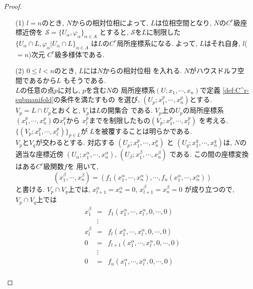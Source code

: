 \documentclass[a4j,12pt]{jarticle}
\theoremstyle{definition}
\begin{document}
\begin{proof}
    \begin{itemize}
        \item[(1)]
        $l=n$のとき, $N$からの相対位相によって, 
        $L$は位相空間となり, 
        $N$の$C^r$級座標近傍を
        $\mathcal{S}=
        \{U_\alpha,\varphi _\alpha\}_{\alpha\in A}$
        とすると, $\mathcal{S}$を$L$に制限した
        $\{U_\alpha \cap L,
        \varphi _\alpha |U_\alpha \cap L\}_{\alpha\in A}$
        は$L$の$C^r$局所座標系になる. 
        よって, $L$はそれ自身, $l$($=n$)次元
        $C^r$級多様体である. 
        \item[(2)] 
        $0\leq l<n$のとき, $L$には$N$からの相対位相
        を入れる. $N$がハウスドルフ空間であるから$L$
        もそうである. \\
        $L$の任意の点$p$に対し, $p$を含む$N$の
        局所座標系$(U;x_1,\cdots ,x_n)$で定義
        \ref{def:C^r-submanifold}の条件を満たすもの
        を選び, $(U_p;x^p_1,\cdots ,x^p_n)$とする. 
        $V_p=L\cap U_p$とおくと, $V_p$は$L$の開集合
        である. $V_p$上の$U_p$の局所座標系
        $(x^p_1, \cdots ,x^p_n)$の$x^p_1$から
        $x^p_l$までを制限したもの$(V_p;x^p_1,\cdots ,x^p_l)$
        を考える. \\
        $\{(V_p;x^p_1,\cdots ,x^p_l)\}_{p\in L}$が
        $L$を被覆することは明らかである.\\
        $V_p$と$V_q$が交わるとする. 対応する
        $(U_p;x^p_1,\cdots ,x^p_n)$ と
        $(U_q;x^q_1,\cdots ,x^q_n)$は, 
        $N$の適当な座標近傍
        $(U_\alpha ;x^\alpha_1, \cdots ,x^\alpha_n)$,
        $(U_\beta ;x^\beta_1, \cdots ,x^\beta_n)$
        である. この間の座標変換はある$C^r$級関数$f$を
        用いて, 
        $$(x^\beta_1, \cdots ,x^\beta_n)
        =(f_1(x^\alpha_1, \cdots ,x^\alpha_n), \cdots 
        , f_n(x^\alpha_1, \cdots ,x^\alpha_n))$$
        と書ける. $V_p\cap V_q$上では, 
        $x^\alpha_{l+1}=x^\alpha_n=0$, $x^\beta_{l+1}=x^\beta_n=0$
        が成り立つので, $V_p\cap V_q$上では
        \begin{eqnarray*}
            x^\beta_1&=&f_1(x^\alpha_1, \cdots ,x^\alpha_l,0,\cdots ,0)\\
            &\vdots& \\
            x^\beta_l&=&f_l(x^\alpha_1, \cdots ,x^\alpha_l,0,\cdots ,0)\\
            0&=&f_{l+1}(x^\alpha_1, \cdots ,x^\alpha_l,0,\cdots ,0)\\
            &\vdots& \\
            0&=&f_n(x^\alpha_1, \cdots ,x^\alpha_l,0,\cdots ,0)\\

\end{eqnarray*}
\end{itemize}
\end{proof}
\end{document}
